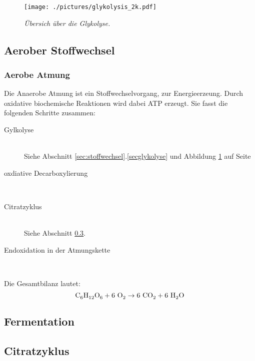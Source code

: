\begin{figure}[htb!]
	\leavevmode
	\begin{center}
		\texttt{[image: ./pictures/glykolysis\_2k.pdf]}
	\end{center}
	\caption{\slshape{Übersich über die Glykolyse.}}
	\label{fig:glykolyse}
\end{figure}

\subsection{Aerober Stoffwechsel}

\subsubsection*{Aerobe Atmung}
Die Anaerobe Atmung ist ein Stoffwechselvorgang,
zur Energieerzeung.
Durch oxidative biochemische Reaktionen wird dabei ATP erzeugt.
Sie fasst die folgenden Schritte zusammen:

\begin{description}
	\item[Gylkolyse]	\hfill	\\
		Siehe Abschnitt \ref{sec:stoffwechsel}.\ref{secglykolyse} 
		und Abbildung \ref{fig:glykolyse} auf Seite \pageref{fig:glykolyse}
	\item[oxdiative Decarboxylierung]	\hfill	\\
	\item[Citratzyklus]	\hfill	\\
		Siehe Abschnitt \ref{sec:citratzyklus}.
	\item[Endoxidation in der Atmungskette]	\hfill	\\
\end{description}

Die Gesamtbilanz lautet:
\begin{equation}
	\ce{C6H12O6} + 6\ \ce{O2} \rightarrow 6\ \ce{CO2} + 6\ \ce{H2O}
	\label{eq:aerobeAtmung}
\end{equation}

\subsection{Fermentation}

\subsection{Citratzyklus}
\label{sec:citratzyklus}
